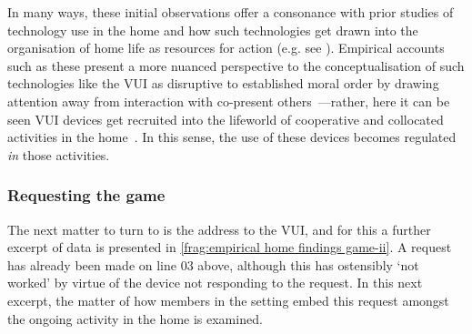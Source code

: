 In many ways, these initial observations offer a consonance with prior studies of technology use in the home and how such technologies get drawn into the organisation of home life as resources for action (e.g. see \citet{Rooksby2015}).
Empirical accounts such as these present a more nuanced perspective to the conceptualisation of such technologies like the \ac{VUI} as disruptive to established moral order by drawing attention away from interaction with co-present others~\citep{Turkle2011}---rather, here it can be seen  \ac{VUI} devices get recruited into the lifeworld of cooperative and collocated activities in the home~\citep{Rigby2017,Rooksby2015,Tolmie2008}.
In this sense, the use of these devices becomes regulated \textit{in} those activities.






\subsubsection{Requesting the game}\label{sec:empirical home findings game address}
\begin{revisedsubmission}
The next matter to turn to is the address to the \ac{VUI}, and for this a further excerpt of data is presented in \autoref{frag:empirical home findings game-ii}.
A request has already been made on line 03 above, although this has ostensibly `not worked' by virtue of the device not responding to the request.
In this next excerpt, the matter of how members in the setting embed this request amongst the ongoing activity in the home is examined.
\end{revisedsubmission}

